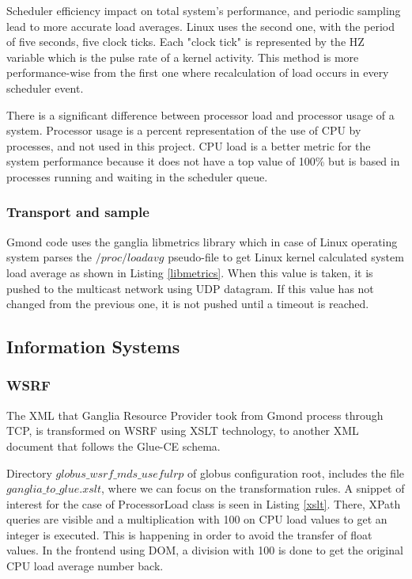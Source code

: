 Scheduler efficiency impact on total system's performance, and periodic sampling lead to more accurate load averages. Linux uses the second one, with the period of five seconds, five clock ticks. Each "clock tick" is represented by the HZ variable which is the pulse rate of a kernel activity. This method is more performance-wise from the first one where recalculation of load occurs in every scheduler event. 

There is a significant difference between processor load and processor usage of a system. Processor usage is a percent representation of the use of CPU by processes, and not used in this project. CPU load is a better metric for the system performance because it does not have a top value of 100\% but is based in processes running and waiting in the scheduler queue.

\subsubsection{Transport and sample}
Gmond code uses the ganglia libmetrics library which in case of Linux operating system parses the $/proc/loadavg$ pseudo-file to get Linux kernel calculated system load average as shown in Listing \ref{libmetrics}. When this value is taken, it is pushed to the multicast network using UDP datagram. If this value has not changed from the previous one, it is not pushed until a timeout is reached.

\subsection{Information Systems}

\subsubsection{WSRF}

The XML that Ganglia Resource Provider took from Gmond process through TCP, is transformed on WSRF using XSLT technology, to another XML document that follows the Glue-CE schema.

Directory $globus\_wsrf\_mds\_usefulrp$ of globus configuration root, includes the file $ganglia\_to\_glue.xslt$, where we can focus on the transformation rules. A snippet of interest for the case of ProcessorLoad class is seen in Listing \ref{xslt}. There, XPath queries are visible and a multiplication with 100 on CPU load values to get an integer is executed. This is happening in order to avoid the transfer of float values. In the frontend using DOM, a division with 100 is done to get the original CPU load average number back.

